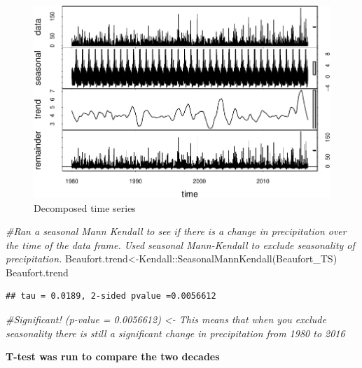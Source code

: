 \documentclass[
  12pt,
]{article}
\newenvironment{Shaded}{\begin{snugshade}}{\end{snugshade}}
\newcommand{\CommentTok}[1]{\textcolor[rgb]{0.56,0.35,0.01}{\textit{#1}}}
\newcommand{\FunctionTok}[1]{\textcolor[rgb]{0.00,0.00,0.00}{#1}}
\newcommand{\NormalTok}[1]{#1}
\newcommand{\OtherTok}[1]{\textcolor[rgb]{0.56,0.35,0.01}{#1}}
\newcommand{\SpecialCharTok}[1]{\textcolor[rgb]{0.00,0.00,0.00}{#1}}
\begin{document}
\begin{figure}
\centering
\includegraphics{Final_Project_Thornton_Katayama_Ngenzi_files/figure-latex/t-test Overall and Seasonal Mann-Kendall Ovearall-1.pdf}
\caption{Decomposed time series}
\end{figure}

\begin{Shaded}
\begin{Highlighting}[]
\CommentTok{\#Ran a seasonal Mann Kendall to see if there is a change in precipitation over the time of the data frame. Used seasonal Mann{-}Kendall to exclude seasonality of precipitation. }
\NormalTok{Beaufort.trend}\OtherTok{\textless{}{-}}\NormalTok{Kendall}\SpecialCharTok{::}\FunctionTok{SeasonalMannKendall}\NormalTok{(Beaufort\_TS)}
\NormalTok{Beaufort.trend}
\end{Highlighting}
\end{Shaded}

\begin{verbatim}
## tau = 0.0189, 2-sided pvalue =0.0056612
\end{verbatim}

\begin{Shaded}
\begin{Highlighting}[]
\CommentTok{\#Significant! (p{-}value = 0.0056612) \textless{}{-} This means that when you exclude seasonality there is still a significant change in precipitation from 1980 to 2016}
\end{Highlighting}
\end{Shaded}

\textbf{T-test was run to compare the two decades}

\begin{Shaded}
\end{Shaded}
\end{document}
